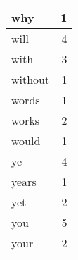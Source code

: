 \begin{center}
\begin{longtable}{l|r}
why & 1 \\ \hline
will & 4 \\ \hline
with & 3 \\ \hline
without & 1 \\ \hline
words & 1 \\ \hline
works & 2 \\ \hline
would & 1 \\ \hline
ye & 4 \\ \hline
years & 1 \\ \hline
yet & 2 \\ \hline
you & 5 \\ \hline
your & 2 \\ \hline
\end{longtable}
\end{center}



\normalsize



